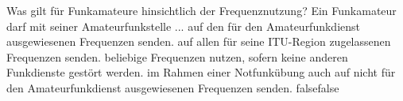     {Was gilt für Funkamateure hinsichtlich der Frequenznutzung? Ein Funkamateur darf mit seiner Amateurfunkstelle ...}
    {auf den für den Amateurfunkdienst ausgewiesenen Frequenzen senden.}
    {auf allen für seine ITU-Region zugelassenen Frequenzen senden.}
    {beliebige Frequenzen nutzen, sofern keine anderen Funkdienste gestört werden.}
    {im Rahmen einer Notfunkübung auch auf nicht für den Amateurfunkdienst ausgewiesenen Frequenzen senden.}
    {false}{false}
